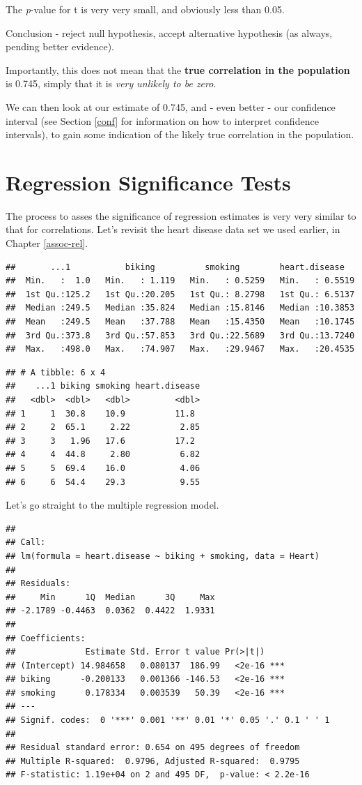 \documentclass[
]{book}
\begin{document}
The \emph{p}-value for t is very very small, and obviously less than 0.05.

Conclusion - reject null hypothesis, accept alternative hypothesis (as always, pending better evidence).

Importantly, this does not mean that the \textbf{true correlation in the population} is 0.745, simply that it is \emph{very unlikely to be zero}.

We can then look at our estimate of 0.745, and - even better - our confidence interval (see Section \ref{conf} for information on how to interpret confidence intervals), to gain some indication of the likely true correlation in the population.

\section{Regression Significance Tests}\label{regression-significance-tests}

The process to asses the significance of regression estimates is very very similar to that for correlations. Let's revisit the heart disease data set we used earlier, in Chapter \ref{assoc-rel}.

\begin{verbatim}
##       ...1           biking          smoking        heart.disease    
##  Min.   :  1.0   Min.   : 1.119   Min.   : 0.5259   Min.   : 0.5519  
##  1st Qu.:125.2   1st Qu.:20.205   1st Qu.: 8.2798   1st Qu.: 6.5137  
##  Median :249.5   Median :35.824   Median :15.8146   Median :10.3853  
##  Mean   :249.5   Mean   :37.788   Mean   :15.4350   Mean   :10.1745  
##  3rd Qu.:373.8   3rd Qu.:57.853   3rd Qu.:22.5689   3rd Qu.:13.7240  
##  Max.   :498.0   Max.   :74.907   Max.   :29.9467   Max.   :20.4535
\end{verbatim}

\begin{verbatim}
## # A tibble: 6 x 4
##    ...1 biking smoking heart.disease
##   <dbl>  <dbl>   <dbl>         <dbl>
## 1     1  30.8    10.9          11.8 
## 2     2  65.1     2.22          2.85
## 3     3   1.96   17.6          17.2 
## 4     4  44.8     2.80          6.82
## 5     5  69.4    16.0           4.06
## 6     6  54.4    29.3           9.55
\end{verbatim}

Let's go straight to the multiple regression model.

\begin{verbatim}
## 
## Call:
## lm(formula = heart.disease ~ biking + smoking, data = Heart)
## 
## Residuals:
##     Min      1Q  Median      3Q     Max 
## -2.1789 -0.4463  0.0362  0.4422  1.9331 
## 
## Coefficients:
##              Estimate Std. Error t value Pr(>|t|)    
## (Intercept) 14.984658   0.080137  186.99   <2e-16 ***
## biking      -0.200133   0.001366 -146.53   <2e-16 ***
## smoking      0.178334   0.003539   50.39   <2e-16 ***
## ---
## Signif. codes:  0 '***' 0.001 '**' 0.01 '*' 0.05 '.' 0.1 ' ' 1
## 
## Residual standard error: 0.654 on 495 degrees of freedom
## Multiple R-squared:  0.9796, Adjusted R-squared:  0.9795 
## F-statistic: 1.19e+04 on 2 and 495 DF,  p-value: < 2.2e-16
\end{verbatim}
\end{document}
